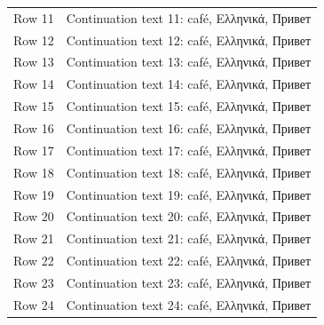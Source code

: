 \documentclass{article}
\begin{document}
\begin{longtable}{>{\raggedright\arraybackslash}p{}>{\raggedright\arraybackslash}p{}}
Row 11\par  & Continuation text 11: café, Ελληνικά, Привет\par  \\
Row 12\par  & Continuation text 12: café, Ελληνικά, Привет\par  \\
Row 13\par  & Continuation text 13: café, Ελληνικά, Привет\par  \\
Row 14\par  & Continuation text 14: café, Ελληνικά, Привет\par  \\
Row 15\par  & Continuation text 15: café, Ελληνικά, Привет\par  \\
Row 16\par  & Continuation text 16: café, Ελληνικά, Привет\par  \\
Row 17\par  & Continuation text 17: café, Ελληνικά, Привет\par  \\
Row 18\par  & Continuation text 18: café, Ελληνικά, Привет\par  \\
Row 19\par  & Continuation text 19: café, Ελληνικά, Привет\par  \\
Row 20\par  & Continuation text 20: café, Ελληνικά, Привет\par  \\
Row 21\par  & Continuation text 21: café, Ελληνικά, Привет\par  \\
Row 22\par  & Continuation text 22: café, Ελληνικά, Привет\par  \\
Row 23\par  & Continuation text 23: café, Ελληνικά, Привет\par  \\
Row 24\par  & Continuation text 24: café, Ελληνικά, Привет\par  \\

\end{longtable}
\end{document}
